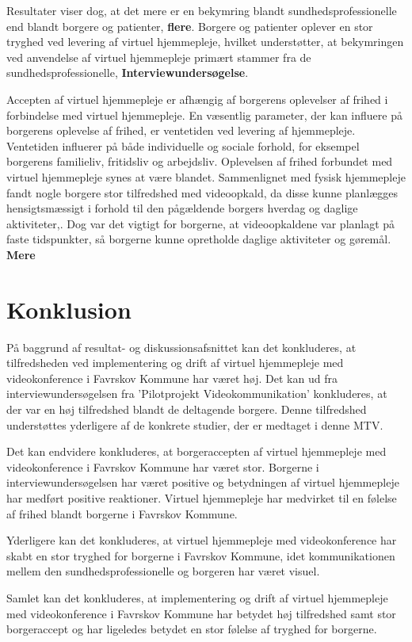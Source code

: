 Resultater viser dog, at det mere er en bekymring blandt sundhedsprofessionelle end blandt borgere og patienter\cite{telenursing}, \textbf{flere}. Borgere og patienter oplever en stor tryghed ved levering af virtuel hjemmepleje, hvilket understøtter, at bekymringen ved anvendelse af virtuel hjemmepleje primært stammer fra de sundhedsprofessionelle\cite{Baf2}, \textbf{Interviewundersøgelse}. 

Accepten af virtuel hjemmepleje er afhængig af borgerens oplevelser af frihed i forbindelse med virtuel hjemmepleje. En væsentlig parameter, der kan influere på borgerens oplevelse af frihed, er ventetiden ved levering af hjemmepleje. Ventetiden influerer på både individuelle og sociale forhold, for eksempel borgerens familieliv, fritidsliv og arbejdsliv. Oplevelsen af frihed forbundet med virtuel hjemmepleje synes at være blandet. Sammenlignet med fysisk hjemmepleje fandt nogle borgere stor tilfredshed med videoopkald, da disse kunne planlægges hensigtsmæssigt i forhold til den pågældende borgers hverdag og daglige aktiviteter\cite{kandidat},\cite{wade}. Dog var det vigtigt for borgerne, at videoopkaldene var planlagt på faste tidspunkter, så borgerne kunne opretholde daglige aktiviteter og gøremål\cite{kandidat}. \textbf{Mere}

\section{Konklusion}
På baggrund af resultat- og diskussionsafsnittet kan det konkluderes, at tilfredsheden ved implementering og drift af virtuel hjemmepleje med videokonference i Favrskov Kommune har været høj. Det kan ud fra interviewundersøgelsen fra ’Pilotprojekt Videokommunikation’ konkluderes, at der var en høj tilfredshed blandt de deltagende borgere. Denne tilfredshed understøttes yderligere af de konkrete studier, der er medtaget i denne MTV.

Det kan endvidere konkluderes, at borgeraccepten af virtuel hjemmepleje med videokonference i Favrskov Kommune har været stor. Borgerne i interviewundersøgelsen har været positive og betydningen af virtuel hjemmepleje har medført positive reaktioner. Virtuel hjemmepleje har medvirket til en følelse af frihed blandt borgerne i Favrskov Kommune.

Yderligere kan det konkluderes, at virtuel hjemmepleje med videokonference har skabt en stor tryghed for borgerne i Favrskov Kommune, idet kommunikationen mellem den sundhedsprofessionelle og borgeren har været visuel. 

Samlet kan det konkluderes, at implementering og drift af virtuel hjemmepleje med videokonference i Favrskov Kommune har betydet høj tilfredshed samt stor borgeraccept og har ligeledes betydet en stor følelse af tryghed for borgerne. 












